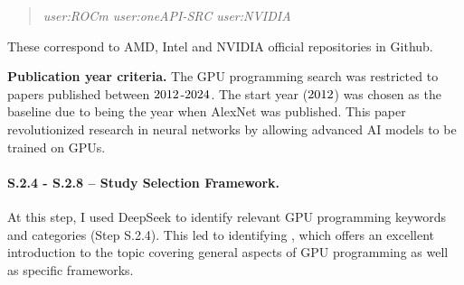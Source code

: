 \begin{quote}
	\textit{user:ROCm user:oneAPI-SRC user:NVIDIA}
\end{quote}

These correspond to AMD, Intel and NVIDIA official repositories in Github.

\textbf{Publication year criteria.}
The GPU programming search was restricted to papers published between
$2012$-$2024$. The start year ($2012$) was chosen as the baseline due
to being the year when AlexNet \cite{krizhevsky_imagenet_2012} was published. This paper
revolutionized research in neural networks by allowing advanced AI models to be trained on GPUs.

\paragraph{S.2.4 - S.2.8 -- Study Selection Framework.}
\label{sec:ai-screening}
At this step, I used DeepSeek \cite{noauthor_deepseek_nodate} to identify relevant GPU programming
keywords and categories (Step S.2.4). This led to identifying \cite{noauthor_enccsgpu-programming_nodate}, which
offers an excellent introduction to the topic covering general aspects of GPU programming as well
as specific frameworks.

